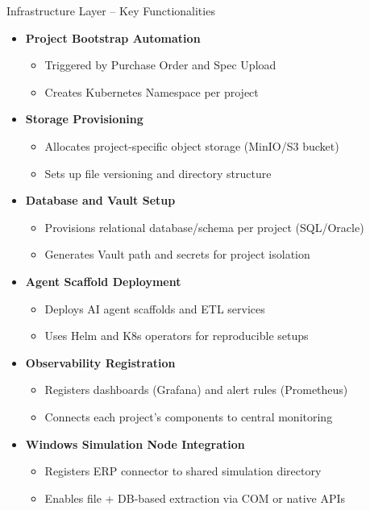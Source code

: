 \begin{frame}{Infrastructure Layer -- Key Functionalities}
\begin{itemize}
    \item \textbf{Project Bootstrap Automation}
    \begin{itemize}
        \item Triggered by Purchase Order and Spec Upload
        \item Creates Kubernetes Namespace per project
    \end{itemize}

    \item \textbf{Storage Provisioning}
    \begin{itemize}
        \item Allocates project-specific object storage (MinIO/S3 bucket)
        \item Sets up file versioning and directory structure
    \end{itemize}

    \item \textbf{Database and Vault Setup}
    \begin{itemize}
        \item Provisions relational database/schema per project (SQL/Oracle)
        \item Generates Vault path and secrets for project isolation
    \end{itemize}

    \item \textbf{Agent Scaffold Deployment}
    \begin{itemize}
        \item Deploys AI agent scaffolds and ETL services
        \item Uses Helm and K8s operators for reproducible setups
    \end{itemize}

    \item \textbf{Observability Registration}
    \begin{itemize}
        \item Registers dashboards (Grafana) and alert rules (Prometheus)
        \item Connects each project’s components to central monitoring
    \end{itemize}

    \item \textbf{Windows Simulation Node Integration}
    \begin{itemize}
        \item Registers ERP connector to shared simulation directory
        \item Enables file + DB-based extraction via COM or native APIs
    \end{itemize}
\end{itemize}
\end{frame}

